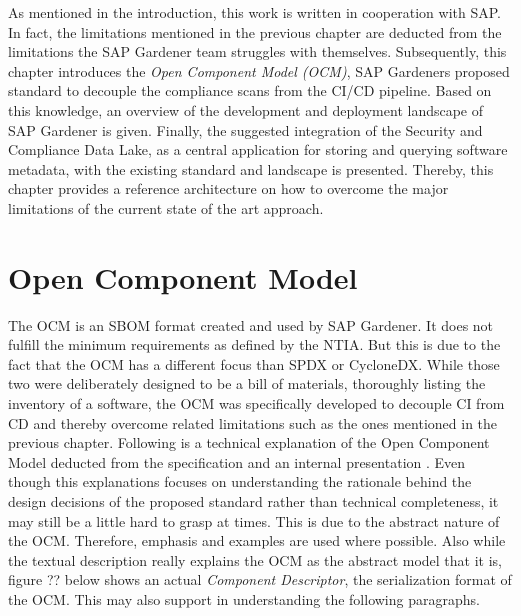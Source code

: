 As mentioned in the introduction, this work is written in cooperation with SAP. In fact, the limitations mentioned in the previous chapter are deducted from the limitations the SAP Gardener team struggles with themselves. Subsequently, this chapter introduces the \textit{Open Component Model (OCM)}, SAP Gardeners proposed standard to decouple the compliance scans from the CI/CD pipeline. Based on this knowledge, an overview of the development and deployment landscape of SAP Gardener is given. Finally, the suggested integration of the Security and Compliance Data Lake, as a central application for storing and querying software metadata, with the existing standard and landscape is presented. Thereby, this chapter provides a reference architecture on how to overcome the major limitations of the current state of the art approach. 

\section{Open Component Model}
The OCM is an SBOM format created and used by SAP Gardener. It does not fulfill the minimum requirements as defined by the NTIA. But this is due to the fact that the OCM has a different focus than SPDX or CycloneDX. While those two were deliberately designed to be a bill of materials, thoroughly listing the inventory of a software, the OCM was specifically developed to decouple CI from CD and thereby overcome related limitations such as the ones mentioned in the previous chapter. Following is a technical explanation of the Open Component Model deducted from the specification \cite{OCMSpec} and an internal presentation \cite{OCMInternalPresentation}. Even though this explanations focuses on understanding the rationale behind the design decisions of the proposed standard rather than technical completeness, it may still be a little hard to grasp at times. This is due to the abstract nature of the OCM. Therefore, emphasis and examples are used where possible. Also while the textual description really explains the OCM as the abstract model that it is, figure ?? below shows an actual \emph{Component Descriptor}, the serialization format of the OCM. This may also support in understanding the following paragraphs.\\\\


